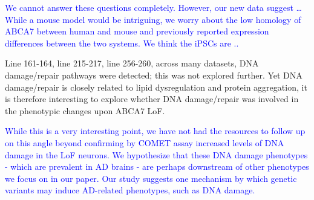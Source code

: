 \textcolor{blue}{We cannot answer these questions completely. However, our new data suggest …While a mouse model would be intriguing, we worry about the low homology of ABCA7 between human and mouse and previously reported expression differences between the two systems. We think the iPSCs are ..}

Line 161-164, line 215-217, line 256-260, across many datasets, DNA damage/repair pathways were detected; this was not explored further. Yet DNA damage/repair is closely related to lipid dysregulation and protein aggregation, it is therefore interesting to explore whether DNA damage/repair was involved in the phenotypic changes upon ABCA7 LoF.

\textcolor{blue}{While this is a very interesting point, we have not had the resources to follow up on this angle beyond confirming by COMET assay increased levels of DNA damage in the LoF neurons. We hypothesize that these DNA damage phenotypes - which are prevalent in AD brains - are perhaps downstream of other phenotypes we focus on in our paper. Our study suggests one mechanism by which genetic variants may induce AD-related phenotypes, such as DNA damage.}
